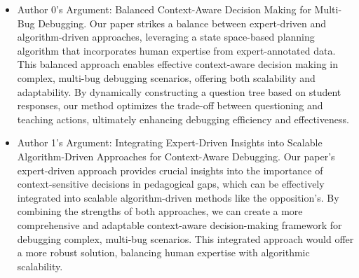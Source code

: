 \begin{enumerate}
\begin{enumerate}
        \begin{itemize}
            \item Author 0's Argument: Balanced Context-Aware Decision Making for Multi-Bug Debugging. Our paper strikes a balance between expert-driven and algorithm-driven approaches, leveraging a state space-based planning algorithm that incorporates human expertise from expert-annotated data. This balanced approach enables effective context-aware decision making in complex, multi-bug debugging scenarios, offering both scalability and adaptability. By dynamically constructing a question tree based on student responses, our method optimizes the trade-off between questioning and teaching actions, ultimately enhancing debugging efficiency and effectiveness.
		\item Author 1's Argument: Integrating Expert-Driven Insights into Scalable Algorithm-Driven Approaches for Context-Aware Debugging. Our paper's expert-driven approach provides crucial insights into the importance of context-sensitive decisions in pedagogical gaps, which can be effectively integrated into scalable algorithm-driven methods like the opposition's. By combining the strengths of both approaches, we can create a more comprehensive and adaptable context-aware decision-making framework for debugging complex, multi-bug scenarios. This integrated approach would offer a more robust solution, balancing human expertise with algorithmic scalability.
        \end{itemize}
    \end{enumerate}





\end{enumerate}
